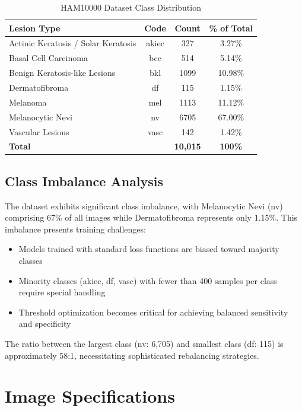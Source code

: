 \begin{table}[H]
\centering
\caption{HAM10000 Dataset Class Distribution}
\label{tab:dataset_distribution}
\begin{tabular}{|l|c|c|c|}
\hline
\textbf{Lesion Type} & \textbf{Code} & \textbf{Count} & \textbf{\% of Total} \\
\hline
Actinic Keratosis / Solar Keratosis & akiec & 327 & 3.27\% \\
Basal Cell Carcinoma & bcc & 514 & 5.14\% \\
Benign Keratosis-like Lesions & bkl & 1099 & 10.98\% \\
Dermatofibroma & df & 115 & 1.15\% \\
Melanoma & mel & 1113 & 11.12\% \\
Melanocytic Nevi & nv & 6705 & 67.00\% \\
Vascular Lesions & vasc & 142 & 1.42\% \\
\hline
\textbf{Total} & & \textbf{10,015} & \textbf{100\%} \\
\hline
\end{tabular}
\end{table}

\subsection{Class Imbalance Analysis}

The dataset exhibits significant class imbalance, with Melanocytic Nevi (nv) comprising 67\% of all images while Dermatofibroma represents only 1.15\%. This imbalance presents training challenges:

\begin{itemize}
    \item Models trained with standard loss functions are biased toward majority classes
    \item Minority classes (akiec, df, vasc) with fewer than 400 samples per class require special handling
    \item Threshold optimization becomes critical for achieving balanced sensitivity and specificity
\end{itemize}

The ratio between the largest class (nv: 6,705) and smallest class (df: 115) is approximately 58:1, necessitating sophisticated rebalancing strategies.

\section{Image Specifications}

